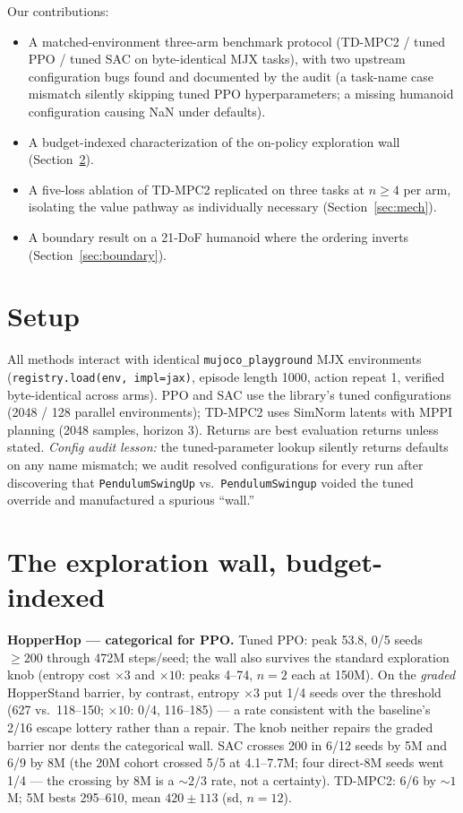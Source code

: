 \documentclass[10pt]{article}
\begin{document}
Our contributions:
\begin{itemize}
\item A matched-environment three-arm benchmark protocol (TD-MPC2 / tuned PPO / tuned SAC on byte-identical
MJX tasks), with two upstream configuration bugs found and documented by the audit (a task-name case mismatch
silently skipping tuned PPO hyperparameters; a missing humanoid configuration causing NaN under defaults).
\item A budget-indexed characterization of the on-policy exploration wall (Section~\ref{sec:wall}).
\item A five-loss ablation of TD-MPC2 replicated on three tasks at $n{\ge}4$ per arm, isolating the value
pathway as individually necessary (Section~\ref{sec:mech}).
\item A boundary result on a 21-DoF humanoid where the ordering inverts (Section~\ref{sec:boundary}).
\end{itemize}

\section{Setup}\label{sec:setup}
All methods interact with identical \texttt{mujoco\_playground} MJX environments
(\texttt{registry.load(env, impl=jax)}, episode length 1000, action repeat 1, verified byte-identical
across arms). PPO and SAC use the library's tuned configurations (2048 / 128 parallel environments); TD-MPC2
uses SimNorm latents with MPPI planning (2048 samples, horizon 3). Returns are best evaluation returns unless
stated. \emph{Config audit lesson:} the tuned-parameter lookup silently returns defaults on any name mismatch;
we audit resolved configurations for every run after discovering that \texttt{PendulumSwingUp} vs.\
\texttt{PendulumSwingup} voided the tuned override and manufactured a spurious ``wall.''

\section{The exploration wall, budget-indexed}\label{sec:wall}
\textbf{HopperHop --- categorical for PPO.} Tuned PPO: peak 53.8, 0/5 seeds ${\ge}200$ through 472M steps/seed;
the wall also survives the standard exploration knob (entropy cost $\times 3$ and $\times 10$: peaks 4--74,
$n{=}2$ each at 150M). On the \emph{graded} HopperStand barrier, by contrast, entropy $\times 3$ put 1/4 seeds over the threshold
(627 vs.\ 118--150; $\times 10$: 0/4, 116--185) --- a rate consistent with the baseline's 2/16 escape lottery
rather than a repair. The knob neither repairs the graded barrier nor dents the categorical wall.
SAC crosses 200 in 6/12 seeds by 5M and 6/9 by 8M (the 20M cohort crossed 5/5 at 4.1--7.7M; four direct-8M
seeds went 1/4 --- the crossing by 8M is a ${\sim}2/3$ rate, not a certainty). TD-MPC2: 6/6 by
${\sim}1$M; 5M bests 295--610, mean $420 \pm 113$ (sd, $n{=}12$).
\end{document}
